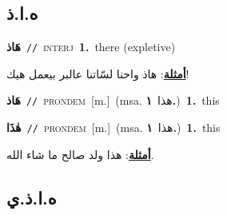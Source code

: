 \documentclass[10pt,a4paper,twoside]{article} %
\begin{document}
\begin{multicols}{2}
\vspace{-3mm}
\subsection*{\color{blue}\foreignlanguage{arabic}{ه.ا.ذ}\color{blue}{ (ntws)}} 

{\setlength\topsep{0pt}\textbf{\foreignlanguage{arabic}{هَاذ}}\ {\color{gray}\texttt{//}\color{black}}\ \textsc{interj}\ \textbf{1.}~there (expletive)\  \begin{flushright}\color{gray}\foreignlanguage{arabic}{\textbf{\underline{\foreignlanguage{arabic}{أمثلة}}}: هاذ واحنا لسّاتنا عالبر بيعمل هيك!}\end{flushright}\color{black}} \vspace{2mm}

{\setlength\topsep{0pt}\textbf{\foreignlanguage{arabic}{هَاذ}}\ {\color{gray}\texttt{//}\color{black}}\ \textsc{pron\textunderscore dem}\ [m.]\ \color{gray}(msa. \foreignlanguage{arabic}{هذا}~\foreignlanguage{arabic}{\textbf{١.}})\color{black}\ \textbf{1.}~this\ } \vspace{2mm}

{\setlength\topsep{0pt}\textbf{\foreignlanguage{arabic}{هٰذَا}}\ {\color{gray}\texttt{//}\color{black}}\ \textsc{pron\textunderscore dem}\ [m.]\ \color{gray}(msa. \foreignlanguage{arabic}{هذا}~\foreignlanguage{arabic}{\textbf{١.}})\color{black}\ \textbf{1.}~this\  \begin{flushright}\color{gray}\foreignlanguage{arabic}{\textbf{\underline{\foreignlanguage{arabic}{أمثلة}}}: هذا ولد صالح ما شاء الله.}\end{flushright}\color{black}} \vspace{2mm}

\vspace{-3mm}
\subsection*{\color{blue}\foreignlanguage{arabic}{ه.ا.ذ.ي}\color{blue}{ (ntws)}} 


\end{multicols}
\end{document}

